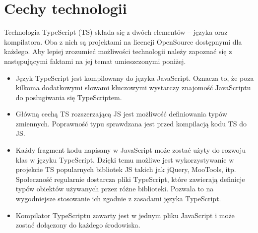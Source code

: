 \section{Cechy technologii}
Technologia TypeScript (TS) składa się z dwóch elementów -- języka oraz kompilatora. Oba z nich są projektami na licencji OpenSource dostępnymi dla każdego. Aby lepiej zrozumieć możliwości technologii należy zapoznać się z następującymi faktami na jej temat umieszczonymi poniżej.
\begin{itemize}
\item Język TypeScript jest kompilowany do języka JavaScript. Oznacza to, że poza kilkoma dodatkowymi słowami kluczowymi wystarczy znajomość JavaScriptu do posługiwania się TypeScriptem. 
\item Główną cechą TS rozszerzającą JS jest możliwość definiowania typów zmiennych. Poprawność typu sprawdzana jest przed kompilacją kodu TS do JS.
\item Każdy fragment kodu napisany w JavaScript może zostać użyty do rozwoju klas w języku TypeScript. Dzięki temu możliwe jest wykorzystywanie w projekcie TS popularnych bibliotek JS takich jak jQuery, MooTools, itp. Społeczność regularnie dostarcza pliki TypeScript, które zawierają definicje typów obiektów używanych przez różne biblioteki. Pozwala  to na wygodniejsze stosowanie ich zgodnie z zasadami języka TypeScript. 
\item Kompilator TypeScriptu zawarty jest w jednym pliku JavaScript i może zostać dołączony do każdego środowiska.
\end{itemize}


